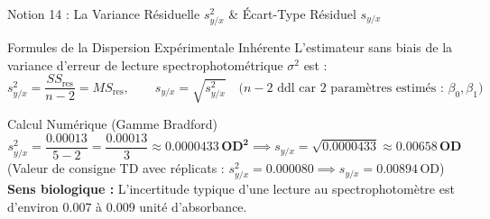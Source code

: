 \documentclass[aspectratio=169,10pt]{beamer}
\begin{document}
\begin{frame}{Notion 14 : La Variance Résiduelle $s_{y/x}^2$ \& Écart-Type Résiduel $s_{y/x}$}
  \begin{conceptbox}{Formules de la Dispersion Expérimentale Inhérente}
    \footnotesize
    L'estimateur sans biais de la variance d'erreur de lecture spectrophotométrique $\sigma^2$ est :
    \begin{equation*}
      s_{y/x}^2 = \frac{SS_{\text{res}}}{n - 2} = MS_{\text{res}}, \qquad s_{y/x} = \sqrt{s_{y/x}^2} \quad \text{($n-2$ ddl car 2 paramètres estimés : $\beta_0, \beta_1$)}
    \end{equation*}
  \end{conceptbox}
  \vspace{1mm}
  \begin{biobox}{Calcul Numérique (Gamme Bradford)}
    \footnotesize
    \begin{equation*}
      s_{y/x}^2 = \frac{0.00013}{5 - 2} = \frac{0.00013}{3} \approx \mathbf{0.0000433\,\text{OD}^2} \implies s_{y/x} = \sqrt{0.0000433} \approx \mathbf{0.00658\,\text{OD}}
    \end{equation*}
    {\scriptsize (Valeur de consigne TD avec réplicats : $s_{y/x}^2 = 0.000080 \implies s_{y/x} = 0.00894\,\text{OD}$)}\\
    \textbf{Sens biologique :} L'incertitude typique d'une lecture au spectrophotomètre est d'environ $0.007$ à $0.009$ unité d'absorbance.
  \end{biobox}
\end{frame}
\end{document}
